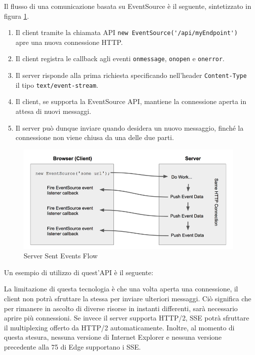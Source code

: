 \documentclass[12pt,a4paper,openright]{report}
\begin{document}
Il flusso di una comunicazione basata su EventSource è il seguente\cite{eventsource_api}, sintetizzato in figura \ref{fig:server_sent_events}.

\begin{enumerate}
  \item Il client tramite la chiamata API \lstinline{new EventSource('/api/myEndpoint')} apre una nuova connessione HTTP.
  \item Il client registra le callback agli eventi \lstinline{onmessage}, \lstinline{onopen} e \lstinline{onerror}.
  \item Il server risponde alla prima richiesta specificando nell'header \lstinline{Content-Type} il tipo \lstinline{text/event-stream}.
  \item Il client, se supporta la EventSource API, mantiene la connessione aperta in attesa di nuovi messaggi.
  \item Il server può dunque inviare quando desidera un nuovo messaggio, finché la connessione non viene chiusa da una delle due parti.
\end{enumerate}

\begin{figure}[!htbp]
\centering
\includegraphics[width=.5\textwidth]{assets/server_sent_events.png}
\caption{Server Sent Events Flow}
\label{fig:server_sent_events}
\end{figure}

Un esempio di utilizzo di quest'API è il seguente:


La limitazione di questa tecnologia è che una volta aperta una connessione, il client non potrà sfruttare la stessa per inviare ulteriori messaggi. Ciò significa che per rimanere in ascolto di diverse risorse in instanti differenti, sarà necessario aprire più connessioni. Se invece il server supporta HTTP/2, SSE potrà sfruttare il multiplexing offerto da HTTP/2 automaticamente.
Inoltre, al momento di questa stesura, nessuna versione di Internet Explorer e nessuna versione precedente alla 75 di Edge supportano i SSE\cite{sse_support_caniuse}.

\end{document}

